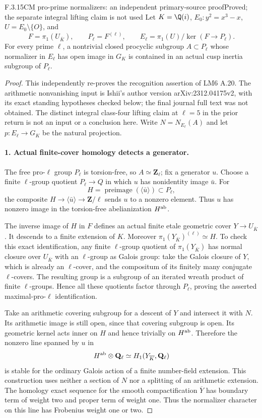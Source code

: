 \begin{result}{F.3.15}{CM pro-prime normalizers: an independent primary-source proof}{Proved; the separate integral lifting claim is not used}
Let $K=\Q(i)$, $E_0:y^2=x^3-x$, $U=E_0\setminus\{O\}$, and
\[
 F=\pi_1(U_{\overline K}),\qquad P_\ell=F^{(\ell)},\qquad
 E_\ell=\pi_1(U)/\ker(F\to P_\ell).
\]
For every prime $\ell$, a nontrivial closed procyclic subgroup $A\subset P_\ell$ whose normalizer in $E_\ell$ has open image in $G_K$ is contained in an actual cusp inertia subgroup of $P_\ell$.
\end{result}
\begin{proof}
This independently re-proves the recognition assertion of LM6 A.20. The arithmetic nonvanishing input is Ishii's author version arXiv:2312.04175v2, with its exact standing hypotheses checked below; the final journal full text was not obtained. The distinct integral class-four lifting claim at $\ell=5$ in the prior return is not an input or a conclusion here.
Write $N=N_{E_\ell}(A)$ and let $p:E_\ell\to G_K$ be the natural projection.

\paragraph{1. Actual finite-cover homology detects a generator.}
The free pro-$\ell$ group $P_\ell$ is torsion-free, so $A\simeq\mathbf Z_\ell$; fix a generator $u$. Choose a finite $\ell$-group quotient $P_\ell\to Q$ in which $u$ has nonidentity image $\bar u$. For
\[
 H=\operatorname{preimage}(\langle\bar u\rangle)\subset P_\ell,
\]
the composite $H\to\langle\bar u\rangle\to\mathbf Z/\ell$ sends $u$ to a nonzero element. Thus $u$ has nonzero image in the torsion-free abelianization $H^{\rm ab}$.

The inverse image of $H$ in $F$ defines an actual finite etale geometric cover $Y\to U_{\overline K}$. It descends to a finite extension of $K$. Moreover $\pi_1(Y_{\overline K})^{(\ell)}\simeq H$. To check this exact identification, any finite $\ell$-group quotient of $\pi_1(Y_{\overline K})$ has normal closure over $U_{\overline K}$ with an $\ell$-group as Galois group: take the Galois closure of $Y$, which is already an $\ell$-cover, and the compositum of its finitely many conjugate $\ell$-covers. The resulting group is a subgroup of an iterated wreath product of finite $\ell$-groups. Hence all these quotients factor through $P_\ell$, proving the asserted maximal-pro-$\ell$ identification.

Take an arithmetic covering subgroup for a descent of $Y$ and intersect it with $N$. Its arithmetic image is still open, since that covering subgroup is open. Its geometric kernel acts inner on $H$ and hence trivially on $H^{\rm ab}$. Therefore the nonzero line spanned by $u$ in
\[
 H^{\rm ab}\otimes\mathbf Q_\ell
 \simeq H_1(Y_{\overline K},\mathbf Q_\ell)
\]
is stable for the ordinary Galois action of a finite number-field extension. This construction uses neither a section of $N$ nor a splitting of an arithmetic extension. The homology exact sequence for the smooth compactification $\overline Y$ has boundary term of weight two and proper term of weight one. Thus the normalizer character on this line has Frobenius weight one or two.


\end{proof}
